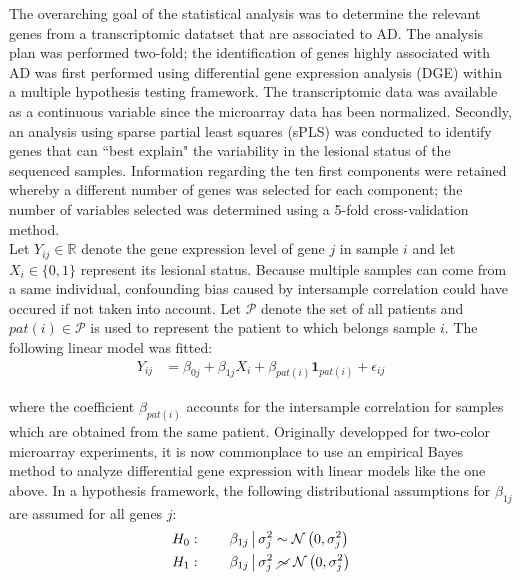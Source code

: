 \documentclass[journal, a4paper]{IEEEtran}
\def\one{\mathbf{1}}
\begin{document}
The overarching goal of the statistical analysis was to determine the relevant genes from a transcriptomic datatset that are associated to AD. The analysis plan was performed two-fold; the identification of genes highly associated with AD was first performed using differential gene expression analysis (DGE) within a multiple hypothesis testing framework. The transcriptomic data was available as a continuous variable since the microarray data has been normalized. Secondly, an analysis using sparse partial least squares (sPLS) was conducted to identify genes that can ``best explain" the variability in the lesional status of the sequenced samples. Information regarding the ten first components were retained whereby a different number of genes was selected for each component; the number of variables selected was determined using a 5-fold cross-validation method.\\

Let $Y_{ij} \in \mathbb{R}$ denote the gene expression level of gene $j$ in sample $i$ and let $X_i \in \{0, 1\}$ represent its lesional status. Because multiple samples can come from a same individual, confounding bias caused by intersample correlation could have occured if not taken into account. Let $\mathcal{P}$ denote the set of all patients and $pat(i) \in \mathcal{P}$ is used to represent the patient to which belongs sample $i$. The following linear model was fitted:
\begin{align*}
  Y_{ij} &=\beta_{0j} + \beta_{1j}X_i + \beta_{pat(i)}\one_{pat(i)} + \epsilon_{ij}
\end{align*}

\noindent where the coefficient $\beta_{pat(i)}$ accounts for the intersample correlation for samples which are obtained from the same patient. Originally developped for two-color microarray experiments, it is now commonplace to use an empirical Bayes method to analyze differential gene expression with linear models like the one above\cite{smyth2004linear}. In a hypothesis framework, the following distributional assumptions for $\beta_{1j}$ are assumed for all genes $j$:
\begin{align*}
  H_0:\qquad \beta_{1j} \,\big\vert\, \sigma^2_j &\sim \mathcal{N}\left(0, \sigma^2_j\right)\\
  H_1:\qquad \beta_{1j} \,\big\vert\, \sigma^2_j &\,\,\cancel{\sim}\,\, \mathcal{N}\left(0, \sigma^2_j\right)
\end{align*}
\end{document}
